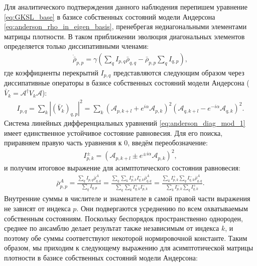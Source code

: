 Для аналитического подтверждения данного наблюдения перепишем уравнение \cref{eq:GKSL_base} в базисе собственных состояний модели Андерсона \cref{eq:anderson_rho_in_eigen_basis}, пренебрегая недиагональными элементами матрицы плотности. В таком приближении эволюция диагональных элементов определяется только диссипативными членами:
\begin{equation}
	\label{eq:anderson_diag_mod_1}
	\begin{gathered}
		\dot{\bar{\rho}}_{p,p} = \gamma \left( \sum_q I_{p,q}\bar{\rho}_{q,q} - \bar{\rho}_{p,p} \sum_q I_{q,p} \right),
	\end{gathered}
\end{equation}
где коэффициенты перекрытий \(I_{p,q}\) представляются следующим образом через диссипативные операторы в базисе собственных состояний модели Андерсона (\(\bar{V}_k = \mathcal{A}^\dagger V_k \mathcal{A}\)):
\begin{equation}
	\label{eq:anderson_diag_mod_2}
	\begin{gathered}
		I_{p,q} = \sum_k \left| \left(\bar{V}_k\right)_{q,p} \right|^2 = \sum_k \left(\mathcal{A}_{p, k+l} + e^{i \alpha} \mathcal{A}_{p, k} \right)^2  \left(\mathcal{A}_{q, k+l} - e^{-i \alpha} \mathcal{A}_{q, k} \right)^2.
	\end{gathered}
\end{equation}
Система линейных дифференциальных уравнений \cref{eq:anderson_diag_mod_1} имеет единственное устойчивое состояние равновесия. Для его поиска, приравняем правую часть уравнения к \(0\), введём переобозначение:
\begin{equation}
	\label{eq:anderson_diag_mod_3}
	\begin{gathered}
		I^{\pm}_{p,k} = \left(\mathcal{A}_{p, k+l} \pm e^{\pm i \alpha} \mathcal{A}_{p, k} \right)^2 ,
	\end{gathered}
\end{equation}
и получим итоговое выражение для асимптотического состояния равновесия:
\begin{equation}
	\label{eq:anderson_diag_mod_4}
	\begin{gathered}
		\bar{\rho}^A_{p,p} = \frac{\sum_q I_{p,q}\bar{\rho}^A_{q,q}}{\sum_q I_{q,p}} = \frac{\sum_q \sum_k I^{+}_{p,k} I^{-}_{q,k} \bar{\rho}^A_{q,q}}{\sum_q \sum_k I^{+}_{q,k}  I^{-}_{p,k}} = \frac{\sum_k I^{+}_{p,k} \sum_q I^{-}_{q,k} \bar{\rho}^A_{q,q}}{ \sum_k I^{-}_{p,k} \sum_q  I^{+}_{q,k} } .
	\end{gathered}
\end{equation}
Внутренние суммы в числителе и знаменателе в самой правой части выражения не зависят от индекса \(p\). Они подвергаются усреднению по всем охватываемым собственным состояниям. Поскольку беспорядок пространственно однороден, среднее по ансамблю делает результат также независимым от индекса \(k\), и поэтому обе суммы соответствуют некоторой нормировочной константе. Таким образом, мы приходим к следующему выражению для асимптотической матрицы плотности в базисе собственных состояний модели Андерсона:
